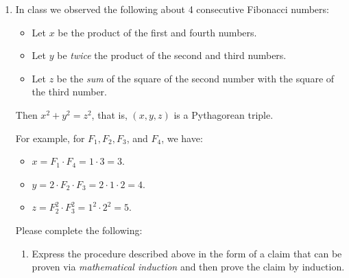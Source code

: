 \documentclass[12pt]{amsart}
\begin{document}
\begin{enumerate}
\begin{enumerate}
\begin{enumerate}
\begin{proof}
Consider two Fibonacci numbers $F_n$ and $F_{n+2}$. By the definition of the Fibonacci sequence, we have that,
%
\[ F_{n+2} = F_n \cdot F_{1} + F_{2} \cdot F_{n-1}. \]

From this, we can see that,
%
\begin{align*}
\gcd(F_n, F_{n+2}) &= \gcd(F_n, F_n \cdot F_{1} + F_2 \cdot F_{n-1}) \\
&= \gcd(F_n, F_n\cdot 1 + 1\cdot F_{n-1}) \\
&= \gcd(F_n, F_{n-1})
\end{align*}
Since by 1(a)(i), $F_n$ and $F_{n-1}$ are relatively prime.

Hence, by 1(a)(i), $\gcd(F_n, F_{n-1}) = \gcd(F_n, F_{n+2}) = 1$.
\end{proof}

\end{enumerate}

\item In class we observed the following about 4 consecutive Fibonacci numbers:
\begin{itemize}\setlength{\itemsep}{6pt}
\item Let $x$ be the product of the first and fourth numbers.
\item Let $y$ be {\it twice} the product of the second and third numbers.
\item Let $z$ be the {\it sum} of the square of the second number with the square of the third number.
\end{itemize}
Then $x^2 + y^2 = z^2$, that is, $(x,y,z)$ is a Pythagorean triple.

For example, for $F_1, F_2, F_3$, and $F_4$, we have:
\begin{itemize}\setlength{\itemsep}{6pt}
\item $x=F_1 \cdot F_4 = 1 \cdot 3 = 3$.
\item $y=2 \cdot F_2 \cdot F_3 = 2\cdot 1 \cdot 2 = 4$.
\item $z=F_2^2 \cdot F_3^2 = 1^2 \cdot 2^2 = 5$.
\end{itemize}

\bigskip

Please complete the following:

\begin{enumerate}\setlength{\itemsep}{6pt}
\item Express the procedure described above in the form of a claim that can be proven via {\it mathematical induction} and then prove the claim by induction.


\end{enumerate}
\end{enumerate}
\end{enumerate}
\end{document}
